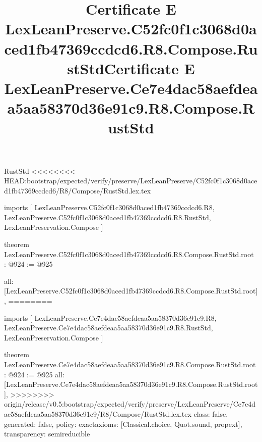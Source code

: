 \begin{lexlean}{RustStd}
<<<<<<<< HEAD:bootstrap/expected/verify/preserve/LexLeanPreserve/C52fc0f1c3068d0aced1fb47369ccdcd6/R8/Compose/RustStd.lex.tex
\title{Certificate E LexLeanPreserve.C52fc0f1c3068d0aced1fb47369ccdcd6.R8.Compose.RustStd}
\begin{coremodule}
imports [
  LexLeanPreserve.C52fc0f1c3068d0aced1fb47369ccdcd6.R8,
  LexLeanPreserve.C52fc0f1c3068d0aced1fb47369ccdcd6.R8.RustStd,
  LexLeanPreservation.Compose
]

theorem LexLeanPreserve.C52fc0f1c3068d0aced1fb47369ccdcd6.R8.Compose.RustStd.root : @924 := @925 {
  all: [LexLeanPreserve.C52fc0f1c3068d0aced1fb47369ccdcd6.R8.Compose.RustStd.root],
========
\title{Certificate E LexLeanPreserve.Ce7e4dac58aefdeaa5aa58370d36e91c9.R8.Compose.RustStd}
\begin{coremodule}
imports [
  LexLeanPreserve.Ce7e4dac58aefdeaa5aa58370d36e91c9.R8,
  LexLeanPreserve.Ce7e4dac58aefdeaa5aa58370d36e91c9.R8.RustStd,
  LexLeanPreservation.Compose
]

theorem LexLeanPreserve.Ce7e4dac58aefdeaa5aa58370d36e91c9.R8.Compose.RustStd.root : @924 := @925 {
  all: [LexLeanPreserve.Ce7e4dac58aefdeaa5aa58370d36e91c9.R8.Compose.RustStd.root],
>>>>>>>> origin/release/v0.5:bootstrap/expected/verify/preserve/LexLeanPreserve/Ce7e4dac58aefdeaa5aa58370d36e91c9/R8/Compose/RustStd.lex.tex
  class: false,
  generated: false,
  policy: exact{axioms: [Classical.choice, Quot.sound, propext]},
  transparency: semireducible
}


\end{coremodule}}
\end{coremodule}
\end{lexlean}
